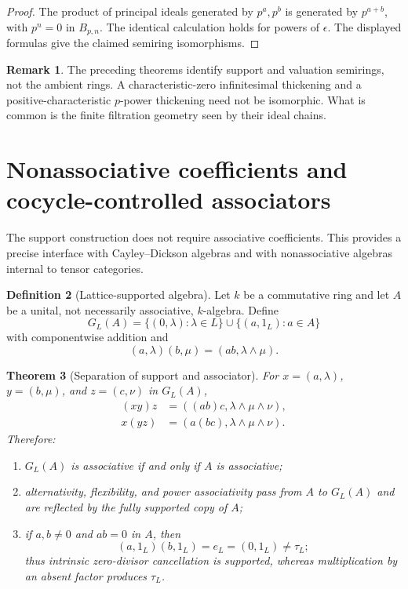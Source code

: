 \documentclass[11pt]{amsart}
\numberwithin{equation}{section}
\newtheorem{theorem}{Theorem}[section]
\theoremstyle{definition}
\newtheorem{definition}[theorem]{Definition}
\newtheorem{remark}[theorem]{Remark}
\begin{document}
\begin{proof}
The product of principal ideals generated by $p^a,p^b$ is generated by
$p^{a+b}$, with $p^n=0$ in $B_{p,n}$.  The identical calculation holds
for powers of $\epsilon$.  The displayed formulas give the claimed
semiring isomorphisms.
\end{proof}

\begin{remark}
The preceding theorems identify support and valuation semirings, not the
ambient rings.  A characteristic-zero infinitesimal thickening and a
positive-characteristic $p$-power thickening need not be isomorphic.  What
is common is the finite filtration geometry seen by their ideal chains.
\end{remark}

\section{Nonassociative coefficients and cocycle-controlled associators}
\label{sec:nonassociative-support}

The support construction does not require associative coefficients.  This
provides a precise interface with Cayley--Dickson algebras and with
nonassociative algebras internal to tensor categories.

\begin{definition}[Lattice-supported algebra]
Let $k$ be a commutative ring and let $A$ be a unital, not necessarily
associative, $k$-algebra.  Define
\[
G_L(A)=
\{(0,\lambda):\lambda\in L\}
\cup
\{(a,1_L):a\in A\}
\]
with componentwise addition and
\[
(a,\lambda)(b,\mu)=(ab,\lambda\wedge\mu).
\]
\end{definition}

\begin{theorem}[Separation of support and associator]
\label{thm:support-associator-separation}
For $x=(a,\lambda)$, $y=(b,\mu)$, and $z=(c,\nu)$ in $G_L(A)$,
\begin{align*}
(xy)z&=((ab)c,\lambda\wedge\mu\wedge\nu),\\
x(yz)&=(a(bc),\lambda\wedge\mu\wedge\nu).
\end{align*}
Therefore:
\begin{enumerate}[label=\textup{(\arabic*)}]
\item $G_L(A)$ is associative if and only if $A$ is associative;
\item alternativity, flexibility, and power associativity pass from $A$
to $G_L(A)$ and are reflected by the fully supported copy of $A$;
\item if $a,b\neq0$ and $ab=0$ in $A$, then
\[
(a,1_L)(b,1_L)=e_L=(0,1_L)\neq\tau_L;
\]
thus intrinsic zero-divisor cancellation is supported, whereas multiplication
by an absent factor produces $\tau_L$.
\end{enumerate}
\end{theorem}
\end{document}

